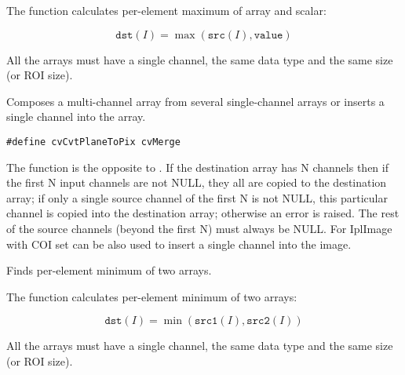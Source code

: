 The function calculates per-element maximum of array and scalar:

\[
\texttt{dst}(I)=\max(\texttt{src}(I), \texttt{value})
\]

All the arrays must have a single channel, the same data type and the same size (or ROI size).


Composes a multi-channel array from several single-channel arrays or inserts a single channel into the array.

\ifC
\begin{lstlisting}
#define cvCvtPlaneToPix cvMerge
\end{lstlisting}
\fi
{}

\begin{description}
\end{description}

The function is the opposite to . If the destination array has N channels then if the first N input channels are not NULL, they all are copied to the destination array; if only a single source channel of the first N is not NULL, this particular channel is copied into the destination array; otherwise an error is raised. The rest of the source channels (beyond the first N) must always be NULL. For IplImage  with COI set can be also used to insert a single channel into the image.

Finds per-element minimum of two arrays.


\begin{description}
\end{description}


The function calculates per-element minimum of two arrays:

\[
\texttt{dst}(I)=\min(\texttt{src1}(I),\texttt{src2}(I))
\]

All the arrays must have a single channel, the same data type and the same size (or ROI size).


